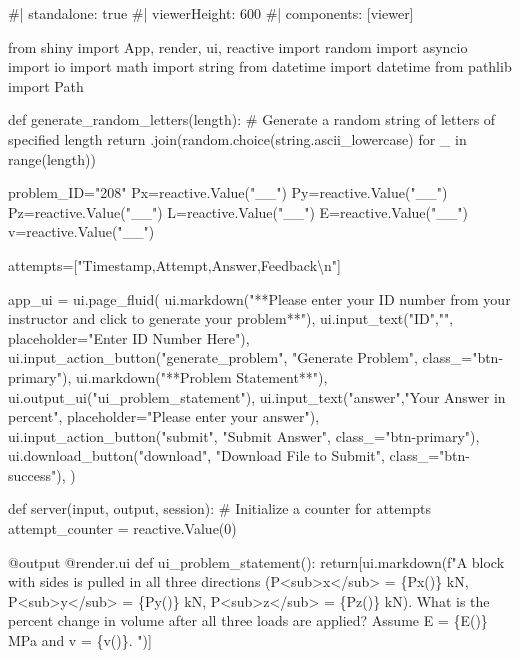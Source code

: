 \documentclass[
  letterpaper,
  DIV=11,
  numbers=noendperiod]{scrreprt}
\newenvironment{Shaded}{\begin{snugshade}}{\end{snugshade}}
\newcommand{\NormalTok}[1]{\textcolor[rgb]{0.00,0.23,0.31}{#1}}
\begin{document}
\begin{Shaded}
\begin{Highlighting}[]
\NormalTok{\#| standalone: true}
\NormalTok{\#| viewerHeight: 600}
\NormalTok{\#| components: [viewer]}

\NormalTok{from shiny import App, render, ui, reactive}
\NormalTok{import random}
\NormalTok{import asyncio}
\NormalTok{import io}
\NormalTok{import math}
\NormalTok{import string}
\NormalTok{from datetime import datetime}
\NormalTok{from pathlib import Path}

\NormalTok{def generate\_random\_letters(length):}
\NormalTok{    \# Generate a random string of letters of specified length}
\NormalTok{    return \textquotesingle{}\textquotesingle{}.join(random.choice(string.ascii\_lowercase) for \_ in range(length)) }

\NormalTok{problem\_ID="208"}
\NormalTok{Px=reactive.Value("\_\_")}
\NormalTok{Py=reactive.Value("\_\_")}
\NormalTok{Pz=reactive.Value("\_\_")}
\NormalTok{L=reactive.Value("\_\_")}
\NormalTok{E=reactive.Value("\_\_")}
\NormalTok{v=reactive.Value("\_\_")}


\NormalTok{attempts=["Timestamp,Attempt,Answer,Feedback\textbackslash{}n"]}

\NormalTok{app\_ui = ui.page\_fluid(}
\NormalTok{    ui.markdown("**Please enter your ID number from your instructor and click to generate your problem**"),}
\NormalTok{    ui.input\_text("ID","", placeholder="Enter ID Number Here"),}
\NormalTok{    ui.input\_action\_button("generate\_problem", "Generate Problem", class\_="btn{-}primary"),}
\NormalTok{    ui.markdown("**Problem Statement**"),}
\NormalTok{    ui.output\_ui("ui\_problem\_statement"),}
\NormalTok{    ui.input\_text("answer","Your Answer in percent", placeholder="Please enter your answer"),}
\NormalTok{    ui.input\_action\_button("submit", "Submit Answer", class\_="btn{-}primary"),}
\NormalTok{    ui.download\_button("download", "Download File to Submit", class\_="btn{-}success"),}
\NormalTok{)}


\NormalTok{def server(input, output, session):}
\NormalTok{    \# Initialize a counter for attempts}
\NormalTok{    attempt\_counter = reactive.Value(0)}

\NormalTok{    @output}
\NormalTok{    @render.ui}
\NormalTok{    def ui\_problem\_statement():}
\NormalTok{        return[ui.markdown(f"A block with sides is pulled in all three directions (P\textless{}sub\textgreater{}x\textless{}/sub\textgreater{} = \{Px()\} kN, P\textless{}sub\textgreater{}y\textless{}/sub\textgreater{} = \{Py()\} kN, P\textless{}sub\textgreater{}z\textless{}/sub\textgreater{} = \{Pz()\} kN). What is the percent change in volume after all three loads are applied? Assume E = \{E()\} MPa and v = \{v()\}. ")]}
    

\end{Highlighting}
\end{Shaded}
\end{document}
